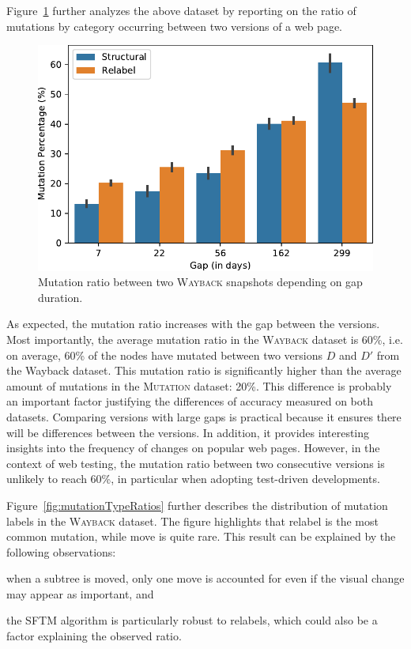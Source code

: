 \vspace{6pt}
Figure~\ref{fig:mutationAmountAnalysis} further analyzes the above dataset by reporting on the ratio of mutations by category occurring between two versions of a web page.

\begin{figure}[]
  \centering
  \includegraphics[width=.8\linewidth]{erratum/mutationAmountAnalysis}
  \caption{Mutation ratio between two \textsc{Wayback} snapshots depending on gap duration.}
  \label{fig:mutationAmountAnalysis}
\end{figure}

As expected, the mutation ratio increases with the gap between the versions.
Most importantly, the average mutation ratio in the \textsc{Wayback} dataset is
60\%, i.e. on average, 60\% of the nodes have mutated between two versions $D$
and $D'$ from the Wayback dataset. This mutation ratio is significantly higher
than the average amount of mutations in the \textsc{Mutation} dataset: 20\%.
This difference is probably an important factor justifying the differences of
accuracy measured on both datasets.
% 
Comparing versions with large gaps is practical because it ensures there will be
differences between the versions.
In addition, it provides interesting insights into the frequency of changes on popular web pages.
However, in the context of web testing, the mutation ratio between two consecutive versions is unlikely to reach 60\%, in particular when adopting test-driven developments.

\vspace{6pt}
Figure~\ref{fig:mutationTypeRatios} further describes the distribution of mutation labels in the \textsc{Wayback} dataset.
The figure highlights that \textsf{relabel} is the most common mutation, while \textsf{move} is quite rare.
This result can be explained by the following observations:
\begin{inparaenum}
  \item when a subtree is moved, only one move is accounted for even if the visual change may appear as important, and
  \item the SFTM algorithm is particularly robust to relabels, which could also be a factor explaining the observed ratio.
\end{inparaenum}

